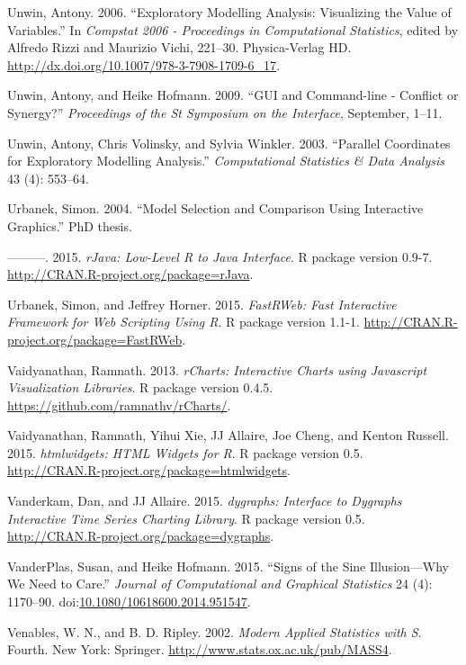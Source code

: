 \documentclass[12pt,]{isuthesis}
\begin{document}
\hypertarget{ref-Unwin:2006}{}
Unwin, Antony. 2006. ``Exploratory Modelling Analysis: Visualizing the
Value of Variables.'' In \emph{Compstat 2006 - Proceedings in
Computational Statistics}, edited by Alfredo Rizzi and Maurizio Vichi,
221--30. Physica-Verlag HD.
\url{http://dx.doi.org/10.1007/978-3-7908-1709-6_17}.

\hypertarget{ref-Unwin:1999vp}{}
Unwin, Antony, and Heike Hofmann. 2009. ``GUI and Command-line -
Conflict or Synergy?'' \emph{Proceedings of the St Symposium on the
Interface}, September, 1--11.

\hypertarget{ref-Unwin:2003uy}{}
Unwin, Antony, Chris Volinsky, and Sylvia Winkler. 2003. ``Parallel
Coordinates for Exploratory Modelling Analysis.'' \emph{Computational
Statistics \& Data Analysis} 43 (4): 553--64.

\hypertarget{ref-Urbanek:2004}{}
Urbanek, Simon. 2004. ``Model Selection and Comparison Using Interactive
Graphics.'' PhD thesis.

\hypertarget{ref-rJava}{}
---------. 2015. \emph{rJava: Low-Level R to Java Interface}. R package
version 0.9-7. \url{http://CRAN.R-project.org/package=rJava}.

\hypertarget{ref-FastRWeb}{}
Urbanek, Simon, and Jeffrey Horner. 2015. \emph{FastRWeb: Fast
Interactive Framework for Web Scripting Using R}. R package version
1.1-1. \url{http://CRAN.R-project.org/package=FastRWeb}.

\hypertarget{ref-rCharts}{}
Vaidyanathan, Ramnath. 2013. \emph{rCharts: Interactive Charts using
Javascript Visualization Libraries}. R package version 0.4.5.
\url{https://github.com/ramnathv/rCharts/}.

\hypertarget{ref-htmlwidgets}{}
Vaidyanathan, Ramnath, Yihui Xie, JJ Allaire, Joe Cheng, and Kenton
Russell. 2015. \emph{htmlwidgets: HTML Widgets for R}. R package version
0.5. \url{http://CRAN.R-project.org/package=htmlwidgets}.

\hypertarget{ref-dygraphs}{}
Vanderkam, Dan, and JJ Allaire. 2015. \emph{dygraphs: Interface to
Dygraphs Interactive Time Series Charting Library}. R package version
0.5. \url{http://CRAN.R-project.org/package=dygraphs}.

\hypertarget{ref-sine-illusion}{}
VanderPlas, Susan, and Heike Hofmann. 2015. ``Signs of the Sine
Illusion---Why We Need to Care.'' \emph{Journal of Computational and
Graphical Statistics} 24 (4): 1170--90.
doi:\href{https://doi.org/10.1080/10618600.2014.951547}{10.1080/10618600.2014.951547}.

\hypertarget{ref-MASS}{}
Venables, W. N., and B. D. Ripley. 2002. \emph{Modern Applied Statistics
with S}. Fourth. New York: Springer.
\url{http://www.stats.ox.ac.uk/pub/MASS4}.
\end{document}
